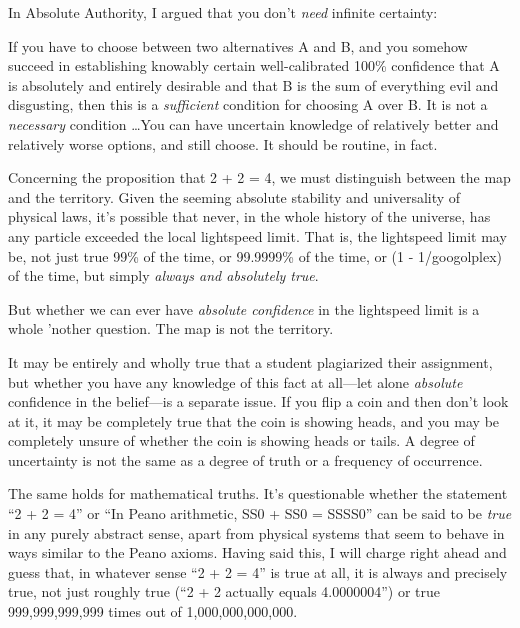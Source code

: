 \myendsectiontext


{
 In Absolute Authority, I argued that you don't
\textit{need} infinite certainty:}

{
 If you have to choose between two alternatives A and B, and you
somehow succeed in establishing knowably certain well-calibrated 100\%
confidence that A is absolutely and entirely desirable and that B is
the sum of everything evil and disgusting, then this is a
\textit{sufficient} condition for choosing A over B. It is not a
\textit{necessary} condition \ldots You can have uncertain knowledge of
relatively better and relatively worse options, and still choose. It
should be routine, in fact.}

{
 Concerning the proposition that 2 + 2 = 4, we must distinguish
between the map and the territory. Given the seeming absolute stability
and universality of physical laws, it's possible that
never, in the whole history of the universe, has any particle exceeded
the local lightspeed limit. That is, the lightspeed limit may be, not
just true 99\% of the time, or 99.9999\% of the time, or (1 -
1/googolplex) of the time, but simply \textit{always and absolutely
true}.}

{
 But whether we can ever have \textit{absolute confidence} in the
lightspeed limit is a whole 'nother question. The map
is not the territory.}

{
 It may be entirely and wholly true that a student plagiarized
their assignment, but whether you have any knowledge of this fact at
all---let alone \textit{absolute} confidence in the belief---is a
separate issue. If you flip a coin and then don't look
at it, it may be completely true that the coin is showing heads, and
you may be completely unsure of whether the coin is showing heads or
tails. A degree of uncertainty is not the same as a degree of truth or
a frequency of occurrence.}

{
 The same holds for mathematical truths. It's
questionable whether the statement ``2 + 2 =
4'' or ``In Peano arithmetic, SS0 +
SS0 = SSSS0'' can be said to be \textit{true} in any
purely abstract sense, apart from physical systems that seem to behave
in ways similar to the Peano axioms. Having said this, I will charge
right ahead and guess that, in whatever sense ``2 + 2
= 4'' is true at all, it is always and precisely
true, not just roughly true (``2 + 2 actually equals
4.0000004'') or true 999,999,999,999 times out of
1,000,000,000,000.}

